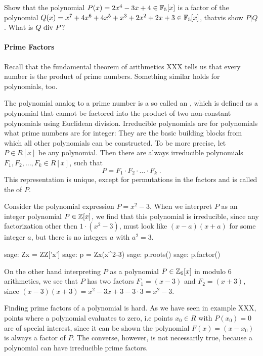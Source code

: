 \begin{exercise}
Show that the polynomial $P(x)= 2x^4-3x+4\in \mathbb{F}_5[x]$ is a factor of the polynomial $Q(x)=x^7 + 4x^6 + 4x^5 + x^3 + 2x^2 + 2x + 3\in\mathbb{F}_5[x]$, thatvis show $P|Q$. What is $Q \text{ div } P$?
\end{exercise}
\paragraph{Prime Factors} Recall that the fundamental theorem of arithmetics XXX tells us that every number is the product of prime numbers. Something similar holds for polynomials, too. 

The polynomial analog to a prime number is a so called an , which is defined as a polynomial that cannot be factored into the product of two non-constant polynomials using Euclidean division. Irreducible polynomials are for polynomials what prime numbers are for integer: They are the basic building blocks from which all other polynomials can be constructed. To be more precise, let $P \in R[x]$ be any polynomial. Then there are always irreducible polynomials $F_1, F_2, \ldots, F_k \in R[x]$, such that
\begin{equation}
P = F_1 \cdot F_2 \cdot \ldots \cdot F_k \;.
\end{equation}
This representation is unique, except for permutations in the factors and is called the  of $P$.
\begin{example} Consider the polynomial expression $P=x^2-3$. When we interpret $P$ as an integer polynomial $P\in\mathbb{Z}[x]$, we find that this polynomial is irreducible, since any factorization other then $1\cdot(x^2-3)$, must look like $(x-a)(x+a)$ for some integer $a$, but there is no integers $a$ with $a^2=3$. 
\begin{sagecommandline}
sage: Zx = ZZ['x']
sage: p = Zx(x^2-3)
sage: p.roots()
sage: p.factor()
\end{sagecommandline}
On the other hand interpreting $P$ as a polynomial $P\in \mathbb{Z}_6[x]$ in modulo $6$ arithmetics, we see that $P$ has two factors $F_1=(x-3)$ and $F_2=(x+3)$, since 
$(x-3)(x+3)= x^2 -3x +3 -3\cdot 3= x^2-3$. 
\end{example}
Finding prime factors of a polynomial is hard. As we have seen in example XXX, points where a polynomial evaluates to zero, i.e points $x_0\in R$ with $P(x_0)=0$ are of special interest, since it can be shown the polynomial $F(x)=(x-x_0)$ is always a factor of $P$. The converse, however, is not necessarily true, because a polynomial can have irreducible prime factors. 

